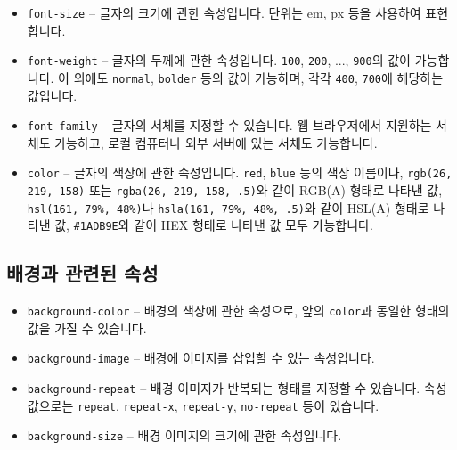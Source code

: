 \begin{itemize}
    \item \verb|font-size| – 글자의 크기에 관한 속성입니다. 단위는 em, px 등을 사용하여 표현합니다. 
    \item \verb|font-weight| – 글자의 두께에 관한 속성입니다. \verb|100|, \verb|200|, ..., \verb|900|의 값이 가능합니다. 이 외에도 \verb|normal|, \verb|bolder| 등의 값이 가능하며, 각각 \verb|400|, \verb|700|에 해당하는 값입니다. 
    \item \verb|font-family| – 글자의 서체를 지정할 수 있습니다. 웹 브라우저에서 지원하는 서체도 가능하고, 로컬 컴퓨터나 외부 서버에 있는 서체도 가능합니다. 
    \item \verb|color| – 글자의 색상에 관한 속성입니다. \verb|red|, \verb|blue| 등의 색상 이름이나, \verb|rgb(26, 219, 158)| 또는 \verb|rgba(26, 219, 158, .5)|와 같이 RGB(A) 형태로 나타낸 값, \verb|hsl(161, 79%, 48%)|나 \verb|hsla(161, 79%, 48%, .5)|와 같이 HSL(A) 형태로 나타낸 값, \verb|#1ADB9E|와 같이 HEX 형태로 나타낸 값 모두 가능합니다. 
\end{itemize}

\subsection*{배경과 관련된 속성}

\begin{itemize}
    \item \verb|background-color| – 배경의 색상에 관한 속성으로, 앞의 \verb|color|과 동일한 형태의 값을 가질 수 있습니다. 
    \item \verb|background-image| – 배경에 이미지를 삽입할 수 있는 속성입니다. 
    \item \verb|background-repeat| – 배경 이미지가 반복되는 형태를 지정할 수 있습니다. 속성값으로는 \verb|repeat|, \verb|repeat-x|, \verb|repeat-y|, \verb|no-repeat| 등이 있습니다. 
    \item \verb|background-size| – 배경 이미지의 크기에 관한 속성입니다. 
\end{itemize}
